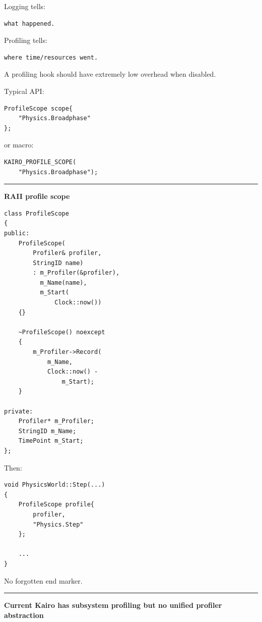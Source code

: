 Logging tells:

\begin{verbatim}
what happened.
\end{verbatim}

Profiling tells:

\begin{verbatim}
where time/resources went.
\end{verbatim}

A profiling hook should have extremely low overhead when disabled.

Typical API:

\begin{verbatim}
ProfileScope scope{
    "Physics.Broadphase"
};
\end{verbatim}

or macro:

\begin{verbatim}
KAIRO_PROFILE_SCOPE(
    "Physics.Broadphase");
\end{verbatim}

\begin{center}\rule{0.5\linewidth}{0.5pt}\end{center}

\textbf{RAII profile scope}

\begin{verbatim}
class ProfileScope
{
public:
    ProfileScope(
        Profiler& profiler,
        StringID name)
        : m_Profiler(&profiler),
          m_Name(name),
          m_Start(
              Clock::now())
    {}

    ~ProfileScope() noexcept
    {
        m_Profiler->Record(
            m_Name,
            Clock::now() -
                m_Start);
    }

private:
    Profiler* m_Profiler;
    StringID m_Name;
    TimePoint m_Start;
};
\end{verbatim}

Then:

\begin{verbatim}
void PhysicsWorld::Step(...)
{
    ProfileScope profile{
        profiler,
        "Physics.Step"
    };

    ...
}
\end{verbatim}

No forgotten end marker.

\begin{center}\rule{0.5\linewidth}{0.5pt}\end{center}

\textbf{Current Kairo has subsystem profiling but no unified profiler abstraction}


